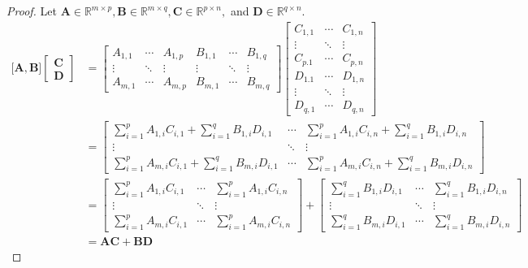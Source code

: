 \documentclass{article}
\theoremstyle{plain}
\begin{document}
\begin{proof}
	Let
	\begin{math}
		\bm{A} \in \mathbb{R}^{m \times p} , \bm{B} \in \mathbb{R}^{m \times q} , \bm{C} \in \mathbb{R}^{p \times n} ,
	\end{math}
	and
	\begin{math}
		\bm{D} \in \mathbb{R}^{q \times n} .
	\end{math}
	\begin{equation*}
		\begin{split}
			\lbrack \bm{A} , \bm{B} \rbrack
			\begin{bmatrix}
				\bm{C} \\
				\bm{D}
			\end{bmatrix}
			&=
			\begin{bmatrix}
				A_{1,1} & \cdots & A_{1,p} & B_{1,1} & \cdots & B_{1,q} \\
				\vdots & \ddots & \vdots & \vdots & \ddots & \vdots \\
				A_{m,1} & \cdots & A_{m,p} & B_{m,1} & \cdots & B_{m,q}
			\end{bmatrix}
			\begin{bmatrix}
				C_{1,1} & \cdots & C_{1,n} \\
				\vdots & \ddots & \vdots \\
				C_{p.1} & \cdots & C_{p,n} \\
				D_{1.1} & \cdots & D_{1,n} \\
				\vdots & \ddots & \vdots \\
				D_{q,1} & \cdots & D_{q,n}
			\end{bmatrix} \\
			&=
			\begin{bmatrix}
				\sum_{i=1}^p A_{1,i} C_{i,1} + \sum_{i=1}^q B_{1,i} D_{i,1} & \cdots & \sum_{i=1}^p A_{1,i} C_{i,n} + \sum_{i=1}^q B_{1,i} D_{i,n} \\
				\vdots & \ddots & \vdots \\
				\sum_{i=1}^p A_{m,i} C_{i,1} + \sum_{i=1}^q B_{m,i} D_{i,1} & \cdots & \sum_{i=1}^p A_{m,i} C_{i,n} + \sum_{i=1}^q B_{m,i} D_{i,n}
			\end{bmatrix} \\
			&=
			\begin{bmatrix}
				\sum_{i=1}^p A_{1,i} C_{i,1} & \cdots & \sum_{i=1}^p A_{1,i} C_{i,n} \\
				\vdots & \ddots & \vdots \\
				\sum_{i=1}^p A_{m,i} C_{i,1} & \cdots & \sum_{i=1}^p A_{m,i} C_{i,n}
			\end{bmatrix}
			+
			\begin{bmatrix}
				\sum_{i=1}^q B_{1,i} D_{i,1} & \cdots & \sum_{i=1}^q B_{1,i} D_{i,n} \\
				\vdots & \ddots & \vdots \\
				\sum_{i=1}^q B_{m,i} D_{i,1} & \cdots & \sum_{i=1}^q B_{m,i} D_{i,n}
			\end{bmatrix} \\
			&=
			\bm{AC} + \bm{BD}
		\end{split}
	\end{equation*}
\end{proof}
\end{document}
